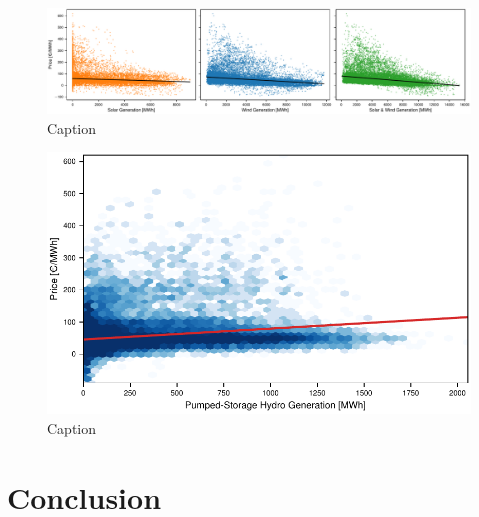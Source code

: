 \documentclass{article}
\begin{document}
\begin{figure}
    \centering
    \includegraphics[width=\textwidth]{doc/fig/solar_wind_regression.pdf}
    \caption{Caption}
    \label{fig:solar_wind_regression}
\end{figure}

\begin{figure}
    \centering
    \includegraphics[width=0.7\columnwidth]{doc/fig/pumped_hydro_regression.pdf}
    \caption{Caption}
    \label{fig:pumped_hydro_regression}
\end{figure}

\section{Conclusion}



\end{document}

